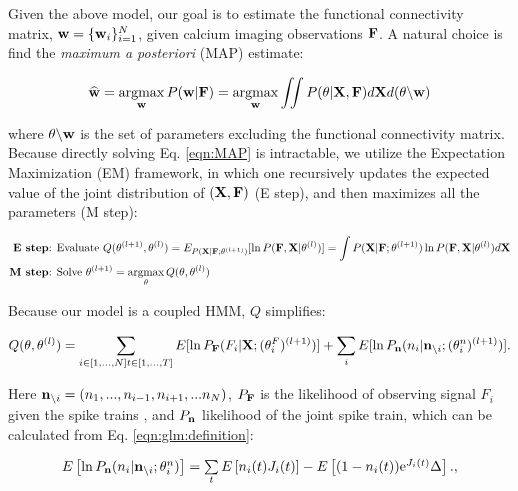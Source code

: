 Given the above model, our goal is to estimate the functional connectivity matrix, $\mathbf{w}=\{\mathbf{w}_i\}_{i=1}^N$, given calcium imaging observations ${\bf F}$. A natural choice is find the \emph{maximum a posteriori} (MAP) estimate:

\begin{equation}\label{eqn:MAP}
\widehat{\mathbf{w}}=\operatorname*{argmax}_{\mathbf{w}} P(\mathbf{w}| {\bf F}) = \operatorname*{argmax}_{\mathbf{w}} \iint P(\mathbf{\theta}| {\bf X}, {\bf F}) d{\bf X} d(\mathbf{\theta} \backslash \mathbf{w})
\end{equation}

\noindent where $\mathbf{\theta} \backslash \mathbf{w}$ is the set of parameters excluding the functional connectivity matrix.  Because directly solving Eq. \eqref{eqn:MAP} is intractable, we utilize the Expectation Maximization (EM) framework, in which one recursively updates the expected value of the joint distribution of $({\bf X}, {\bf F})$ (E step), and then maximizes all the parameters (M step):

\begin{align*}
\textbf{E step} &\text{: Evaluate } Q(\mathbf{\theta}^{(l+1)},\mathbf{\theta}^{(l)}) = E_{P({\bf X} | {\bf F}; \mathbf{\theta}^{(l+1)})}[ \ln P({\bf F}, {\bf X} | \mathbf{\theta}^{(l)})] = \int P({\bf X} | {\bf F}; \mathbf{\theta}^{(l+1)}) \ln P({\bf F}, {\bf X} | \mathbf{\theta}^{(l)}) d {\bf X}  \\
\textbf{M step} &\text{: Solve } \mathbf{\theta}^{(l+1)} = \operatorname*{argmax}_{\mathbf{\theta}} Q(\mathbf{\theta},\mathbf{\theta}^{(l)})  
\end{align*}

Because our model is a coupled HMM, $Q$ simplifies:

\begin{equation}\label{eqn:loglik:definition-expl}
Q(\mathbf{\theta},\mathbf{\theta}^{(l)}) = \sum_{i \in [1,\ldots,N] \\ t \in [1,\ldots, T]} E[\ln P_{{\bf F}}(F_i|{\bf X}; (\mathbf{\theta}^F_i)^{(l+1)} )] + \sum_i E[\ln P_{{\bf n}}(n_i|{\bf n}_{\backslash i};  (\mathbf{\theta}^n_i)^{(l+1)})].
\end{equation}

Here ${\bf n}_{\backslash i}=(n_1, ..., n_{i-1}, n_{i+1}, ...n_N)$, $P_{{\bf F}}$ is the likelihood of observing signal $F_i$ given the spike trains \cite{Vogelstein2009}, and $P_{{\bf n}}$ likelihood of the joint spike train, which can be calculated from Eq. \eqref{eqn:glm:definition}: 

\begin{equation}\label{eqn:likelihoodGLM-expl}
\begin{array}{l}
E\left[\ln P_{\bn}(n_i|{\bf n}_{\i}; \bth^n_i) \right]=\sum\limits_t E \left[ n_i(t) J_i(t)\right] - E\left[(1-n_i(t)) \text{e}^{J_i(t)} \Delta \right].
, %
\end{array}
\end{equation}

